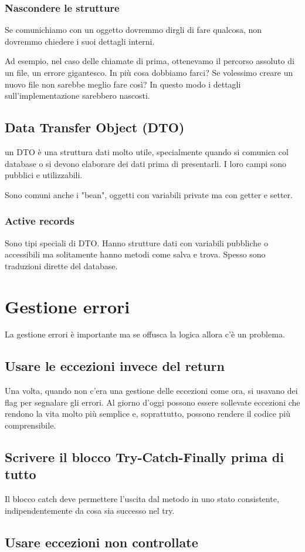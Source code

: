 \documentclass[11pt,a4paper]{book}
\begin{document}
\subsection{Nascondere le strutture}
Se comunichiamo con un oggetto dovremmo dirgli di fare qualcosa, non dovremmo chiedere i suoi dettagli interni.

Ad esempio, nel caso delle chiamate di prima, ottenevamo il percorso assoluto di un file, un errore gigantesco. In più cosa dobbiamo farci? Se volessimo creare un nuovo file non sarebbe meglio fare così?
\label{code: 042}
In questo modo i dettagli sull'implementazione sarebbero nascosti.

\section{Data Transfer Object (DTO)}
un DTO è una struttura dati molto utile, specialmente quando si comunica col database o si devono elaborare dei dati prima di presentarli. I loro campi sono pubblici e utilizzabili.

Sono comuni anche i "bean", oggetti con variabili private ma con getter e setter.
\label{code: 043}

\subsection{Active records}
Sono tipi speciali di DTO. Hanno strutture dati con variabili pubbliche o accessibili ma solitamente hanno metodi come salva e trova. Spesso sono traduzioni dirette del database.

\chapter{Gestione errori}
La gestione errori è importante ma se offusca la logica allora c'è un problema.

\section{Usare le eccezioni invece del return}
Una volta, quando non c'era una gestione delle eccezioni come ora, si usavano dei flag per segnalare gli errori. Al giorno d'oggi possono essere sollevate eccezioni che rendono la vita molto più semplice e, soprattutto, possono rendere il codice più comprensibile.

\section{Scrivere il blocco Try-Catch-Finally prima di tutto}
Il blocco catch deve permettere l'uscita dal metodo in uno stato consistente, indipendentemente da cosa sia successo nel try.

\section{Usare eccezioni non controllate}
\end{document}
